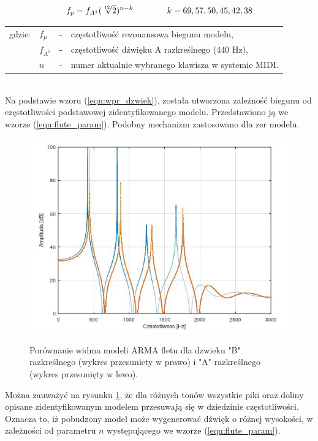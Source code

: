 \begin{equation} \label{equ:flute_param}
\openup\jot
\begin{aligned}[t]
f_{p} = f_{A^{1}}(\sqrt[12]{2})^{n-k} \\ 
\end{aligned}
\qquad\qquad %
\begin{aligned}[t]
k = 69, 57, 50, 45, 42, 38 \\
\end{aligned}
\end{equation}
\begin{tabular}{ l l l l}
	gdzie: & $f_{p}$ &  - & częstotliwość rezonansowa biegunu modelu, \\
	&	$f_{A^{1}}$ & - &  częstotliwość dźwięku A razkreślnego (440 Hz), \\
	&	$n$ & - &  numer aktualnie wybranego klawisza w systemie MIDI.\\
\end{tabular} \\

Na podstawie wzoru (\ref{equ:wpr_dzwiek}), została utworzona zależność biegunu od częstotliwości podstawowej zidentyfikowanego modelu. Przedstawiono ją we wzorze (\ref{equ:flute_param}). Podobny mechanizm zastosowano dla zer modelu. 

\begin{figure}[H]
	\centering
	\includegraphics[width=11.5cm]{grafiki/Model_B_A}
	\label{rys:por_mod_flet}
	\captionsetup{justification=centering}
	\caption{Porównanie widma modeli ARMA fletu dla dzwieku "B" razkreślnego (wykres przesuniety w prawo) i "A" razkreślnego (wykres przesunięty w lewo).}
	\label{rys:por_mod_flet}
\end{figure}
Można zauważyć na rysunku \ref{rys:por_mod_flet}, że dla różnych tonów wszystkie piki oraz doliny opisane zidentyfikowanym modelem przesuwają się w dziedzinie częstotliwości. Oznacza to, iż pobudzony model może wygenerować dźwięk o różnej wysokości, w zależności od parametru $n$ występującego we wzorze (\ref{equ:flute_param}).


